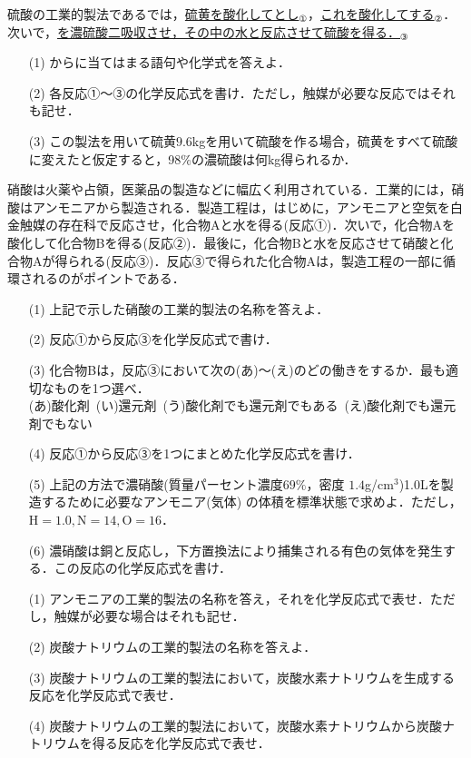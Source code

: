 \documentclass[a4paper,11pt]{ltjsarticle}
\title{}
\author{}
\date{}
\begin{document}
\begin{toi}
    \noindent 硫酸の工業的製法であるでは，\underline{硫黄を酸化してとし}$_{①}$，\underline{これを酸化してする}$_{②}$．次いで，\underline{を濃硫酸二吸収させ，その中の水と反応させて硫酸を得る．}$_{③}$
    \begin{itemize}
    \item [(1)]からに当てはまる語句や化学式を答えよ．
    \item [(2)]各反応①～③の化学反応式を書け．ただし，触媒が必要な反応ではそれも記せ．
    \item [(3)]この製法を用いて硫黄$9.6$kgを用いて硫酸を作る場合，硫黄をすべて硫酸に変えたと仮定すると，98$\%$の濃硫酸は何kg得られるか．
\end{itemize}
\end{toi}

\begin{toi}
硝酸は火薬や占領，医薬品の製造などに幅広く利用されている．工業的には，硝酸はアンモニアから製造される．製造工程は，はじめに，アンモニアと空気を白金触媒の存在科で反応させ，化合物Aと水を得る(反応①)．次いで，化合物Aを酸化して化合物Bを得る(反応②)．最後に，化合物Bと水を反応させて硝酸と化合物Aが得られる(反応③)．反応③で得られた化合物Aは，製造工程の一部に循環されるのがポイントである．
\begin{itemize}
    \item [(1)]上記で示した硝酸の工業的製法の名称を答えよ．
    \item [(2)]反応①から反応③を化学反応式で書け．
    \item [(3)]化合物Bは，反応③において次の(あ)〜(え)のどの働きをするか．最も適切なものを1つ選べ．\\
    (あ)酸化剤~(い)還元剤~(う)酸化剤でも還元剤でもある~(え)酸化剤でも還元剤でもない
    \item[(4)]反応①から反応③を1つにまとめた化学反応式を書け．
    \item[(5)]上記の方法で濃硝酸(質量パーセント濃度$69\%$，密度 $1.4$g/cm$^3$)1.0Lを製造するために必要なアンモニア(気体) の体積を標準状態で求めよ．ただし，$\text{H}=1.0,\text{N}=14,\text{O}=16$．
    \item[(6)]濃硝酸は銅と反応し，下方置換法により捕集される有色の気体を発生する．この反応の化学反応式を書け． 
\end{itemize}
\end{toi}
\begin{toi}
\begin{itemize}
    \item [(1)]アンモニアの工業的製法の名称を答え，それを化学反応式で表せ．ただし，触媒が必要な場合はそれも記せ．
        \item [(2)]炭酸ナトリウムの工業的製法の名称を答えよ．
               \item [(3)]炭酸ナトリウムの工業的製法において，炭酸水素ナトリウムを生成する反応を化学反応式で表せ．
                  \item [(4)]炭酸ナトリウムの工業的製法において，炭酸水素ナトリウムから炭酸ナトリウムを得る反応を化学反応式で表せ．
    \end{itemize}
\end{toi}
\end{document}
